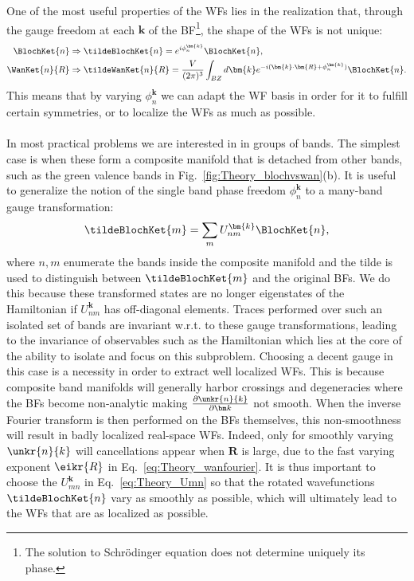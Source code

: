 One of the most useful properties of the WFs lies in the realization that, through the gauge freedom at each $\bm{k}$ of the BF\footnote{The solution to Schr\"odinger equation does not determine uniquely its phase.}, the shape of the WFs is not unique:
\begin{align}
	\BlochKet{n} &\Rightarrow \tildeBlochKet{n} = e^{i \phi_n^{\bm{k}}} \BlochKet{n},\\
	\WanKet{n}{R} &\Rightarrow \tildeWanKet{n}{R} = \frac{V}{(2\pi)^3} \int_{BZ} d \bm{k} e^{-i (\bm{k} \cdot \bm{R} + \phi_n^{\bm{k}})} \BlochKet{n}.
\end{align}
This means that by varying $\phi_n^{\bm{k}}$ we can adapt the WF basis in order for it to fulfill certain symmetries, or to localize the WFs as much as possible.
\\\\
In most practical problems we are interested in in groups of bands.
The simplest case is when these form a composite manifold that is detached from other bands, such as the green valence bands in Fig.~\ref{fig:Theory_blochvswan}(b).
It is useful to generalize the notion of the single band phase freedom $\phi_n^{\bm k}$ to a many-band gauge transformation:
\begin{equation}
	\label{eq:Theory_Umn}
	\tildeBlochKet{m} = \sum_m U_{nm}^{\bm{k}} \BlochKet{n},
\end{equation}
where $n,m$ enumerate the bands inside the composite manifold and the tilde is used to distinguish between $\tildeBlochKet{m}$ and the original BFs.
We do this because these transformed states are no longer eigenstates of the Hamiltonian if $U_{nm}^{\bm{k}}$ has off-diagonal elements.
Traces performed over such an isolated set of bands are invariant w.r.t. to these gauge transformations, leading to the invariance of observables such as the Hamiltonian which lies at the core of the ability to isolate and focus on this subproblem.
Choosing a decent gauge in this case is a necessity in order to extract well localized WFs.
This is because composite band manifolds will generally harbor crossings and degeneracies where the BFs become non-analytic making $\frac{\partial \unkr{n}{k}}{\partial \bm k}$ not smooth.
When the inverse Fourier transform is then performed on the BFs themselves, this non-smoothness will result in badly localized real-space WFs.
Indeed, only for smoothly varying $\unkr{n}{k}$ will cancellations appear when $\bm{R}$ is large, due to the fast varying exponent $\eikr{R}$ in Eq.~\eqref{eq:Theory_wanfourier}.
It is thus important to choose the $U_{mn}^{\bm k}$ in Eq.~\eqref{eq:Theory_Umn} so that the rotated wavefunctions $\tildeBlochKet{n}$ vary as smoothly as possible, which will ultimately lead to the WFs that are as localized as possible.
